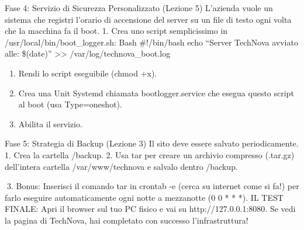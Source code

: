 \documentclass[11pt,a4paper]{article}
\providecommand{\tightlist}{%
  \setlength{\itemsep}{0pt}\setlength{\parskip}{0pt}}
\begin{document}
Fase 4: Servizio di Sicurezza Personalizzato (Lezione 5) L'azienda vuole
un sistema che registri l'orario di accensione del server su un file di
testo ogni volta che la macchina fa il boot. 1. Crea uno script
semplicissimo in /usr/local/bin/boot\_logger.sh: Bash \#!/bin/bash echo
``Server TechNova avviato alle: \$(date)'' \textgreater\textgreater{}
/var/log/technova\_boot.log

\begin{enumerate}
\def\labelenumi{\arabic{enumi}.}
\setcounter{enumi}{1}
\tightlist
\item
  Rendi lo script eseguibile (chmod +x).
\item
  Crea una Unit Systemd chiamata bootlogger.service che esegua questo
  script al boot (usa Type=oneshot).
\item
  Abilita il servizio.
\end{enumerate}

Fase 5: Strategia di Backup (Lezione 3) Il sito deve essere salvato
periodicamente. 1. Crea la cartella /backup. 2. Usa tar per creare un
archivio compresso (.tar.gz) dell'intera cartella /var/www/technova e
salvalo dentro /backup.

3. Bonus: Inserisci il comando tar in crontab -e (cerca su internet come
si fa!) per farlo eseguire automaticamente ogni notte a mezzanotte (0 0
* * *). IL TEST FINALE: Apri il browser sul tuo PC fisico e vai su
http://127.0.0.1:8080. Se vedi la pagina di TechNova, hai completato con
successo l'infrastruttura!


\end{document}
